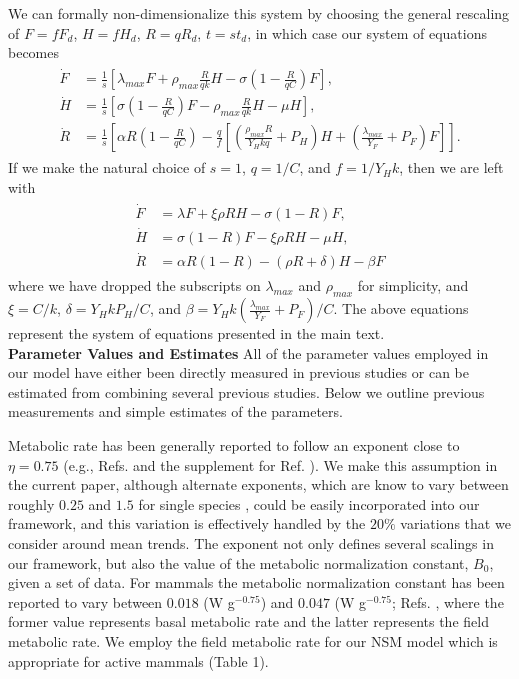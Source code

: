 \documentclass[twocolumn,preprintnumbers,amsmath,amssymb,superscriptaddress]{revtex4}
\begin{document}
\begin{bibunit}[unsrt]
We can formally non-dimensionalize this system by choosing the general rescaling of $F=fF_{d}$, $H=fH_{d}$, $R=qR_{d}$, $t=st_{d}$, in which case our system of equations becomes
\begin{align}
\begin{split}
\dot{F} &= \frac{1}{s}\left[\lambda_{max} F + \rho_{max}\frac{R}{qk}H - \sigma \left(1-\frac{R}{qC}\right)F\right],  \\
\dot{H} &= \frac{1}{s}\left[\sigma \left(1-\frac{R}{qC}\right)F - \rho_{max}\frac{R}{qk} H - \mu H\right],  \\
\dot{R} &= \frac{1}{s}\left[\alpha R\left(1-\frac{R}{qC}\right) -\frac{q}{f}\left[\left(\frac{\rho_{max}R}{Y_{H}kq}+P_{H}\right)H+\left(\frac{\lambda_{max}}{Y_{F}}+P_{F}\right) F\right]\right].
\end{split}
\end{align}
If we make the natural choice of $s=1$, $q=1/C$, and $f=1/Y_{H}k$, then we are left with
\begin{align}
\begin{split}
\dot{F} &= \lambda F + \xi \rho RH - \sigma \left(1-R\right)F,  \\
\dot{H} &= \sigma \left(1-R\right)F - \xi \rho RH - \mu H,  \\
\dot{R} &= \alpha R\left(1-R\right) -\left(\rho R+\delta\right)H-\beta F
\end{split}
\end{align}
where we have dropped the subscripts on $\lambda_{max}$ and $\rho_{max}$ for simplicity, and $\xi=C/k$, $\delta=Y_{H}kP_{H}/C$, and $\beta=Y_{H}k\left(\frac{\lambda_{max}}{Y_{F}}+P_{F}\right)/C$. The above equations represent the system of equations presented in the main text.
\\

{\bf Parameter Values and Estimates}
All of the parameter values employed in our model have either been directly measured in previous studies or can be estimated from combining several previous studies. Below we outline previous measurements and simple estimates of the parameters.

Metabolic rate has been generally reported to follow an exponent close to $\eta=0.75$ (e.g., Refs. \citep{West:2001bv,moses2008rmo} and the supplement for Ref. \citep{hou}). We make this assumption in the current paper, although alternate exponents, which are know to vary between roughly $0.25$ and $1.5$ for single species \citep{moses2008rmo}, could be easily incorporated into our framework, and this variation is effectively handled by the $20\%$ variations that we consider around mean trends. The exponent not only defines several scalings in our framework, but also the value of the metabolic normalization constant, $B_{0}$, given a set of data.  For mammals the metabolic normalization constant has been reported to vary between $0.018$ (W g$^{-0.75}$) and $0.047$ (W g$^{-0.75}$; Refs. \citep{hou,West:2001bv}, where the former value represents basal metabolic rate and the latter represents the field metabolic rate. We employ the field metabolic rate for our NSM model which is appropriate for active mammals (Table 1).


\end{bibunit}
\end{document}

